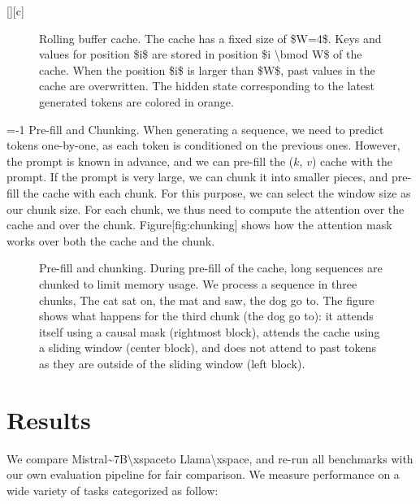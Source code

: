 \documentclass[11pt,a4paper]{article}
\begin{document}
[][c]

\begin{figure}[h]
\caption{Rolling buffer cache. The cache has a fixed size of \$W=4\$. Keys and values for position \$i\$ are stored in position \$i \textbackslash{}bmod W\$ of the cache. When the position \$i\$ is larger than \$W\$, past values in the cache are overwritten. The hidden state corresponding to the latest generated tokens are colored in orange.}
\end{figure}

=-1 Pre-fill and Chunking. When generating a sequence, we need to predict tokens one-by-one, as each token is conditioned on the previous ones. However, the prompt is known in advance, and we can pre-fill the ($k$, $v$) cache with the prompt. If the prompt is very large, we can chunk it into smaller pieces, and pre-fill the cache with each chunk. For this purpose, we can select the window size as our chunk size. For each chunk, we thus need to compute the attention over the cache and over the chunk. Figure[fig:chunking] shows how the attention mask works over both the cache and the chunk.

\begin{figure}[h]
\caption{Pre-fill and chunking. During pre-fill of the cache, long sequences are chunked to limit memory usage. We process a sequence in three chunks, The cat sat on, the mat and saw, the dog go to. The figure shows what happens for the third chunk (the dog go to): it attends itself using a causal mask (rightmost block), attends the cache using a sliding window (center block), and does not attend to past tokens as they are outside of the sliding window (left block).}
\end{figure}

\section{Results}

We compare Mistral\textasciitilde{}7B\textbackslash{}xspaceto Llama\textbackslash{}xspace, and re-run all benchmarks with our own evaluation pipeline for fair comparison. We measure performance on a wide variety of tasks categorized as follow:
\end{document}

